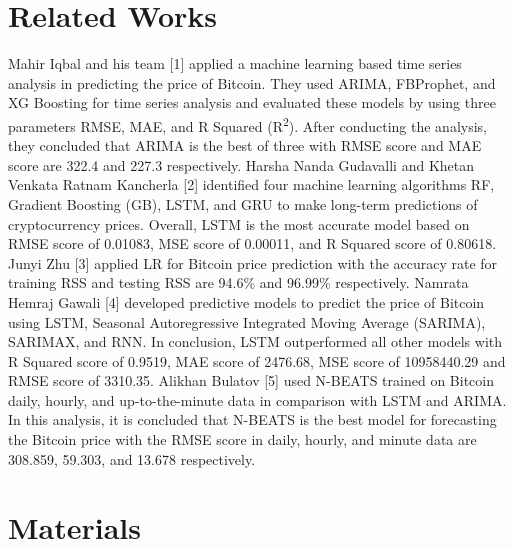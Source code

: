\documentclass{ieeeojies}
\begin{document}
\section{Related Works}
Mahir Iqbal and his team [1] applied a machine learning based time series analysis in predicting the price of Bitcoin. They used ARIMA, FBProphet, and XG Boosting for time series analysis and evaluated these models by using three parameters RMSE, MAE, and R Squared (R\textsuperscript{2}). After conducting the analysis, they concluded that ARIMA is the best of three with RMSE score and MAE score are 322.4 and 227.3 respectively.\newline
Harsha Nanda Gudavalli and Khetan Venkata Ratnam Kancherla [2] identified four machine learning algorithms RF, Gradient Boosting (GB), LSTM, and GRU to make long-term predictions of cryptocurrency prices. Overall, LSTM is the most accurate model based on RMSE score of 0.01083, MSE score of 0.00011, and R Squared score of 0.80618.\newline
Junyi Zhu [3] applied LR for Bitcoin price prediction with the accuracy rate for training RSS and testing RSS are 94.6\% and 96.99\% respectively.\newline
Namrata Hemraj Gawali [4] developed predictive models to predict the price of Bitcoin using LSTM, Seasonal Autoregressive Integrated Moving Average (SARIMA), SARIMAX, and RNN. In conclusion, LSTM outperformed all other models with R Squared score of 0.9519, MAE score of 2476.68, MSE score of 10958440.29 and RMSE score of 3310.35.\newline
Alikhan Bulatov [5] used N-BEATS trained on Bitcoin daily, hourly, and up-to-the-minute data in comparison with LSTM and ARIMA. In this analysis, it is concluded that N-BEATS is the best model for forecasting the Bitcoin price with the RMSE score in daily, hourly, and minute data are 308.859, 59.303, and 13.678 respectively.
\section{Materials}
\end{document}
